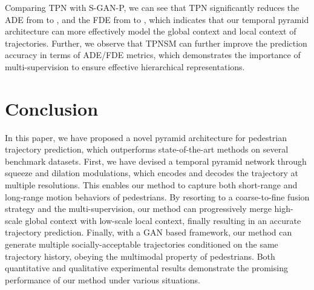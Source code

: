 \documentclass[letterpaper]{article} \usepackage{aaai21}  \usepackage{times}  \usepackage{helvet} \usepackage{courier}  \usepackage[hyphens]{url}  \usepackage{graphicx} \urlstyle{rm} \def\UrlFont{\rm}  \usepackage{natbib}  \usepackage{caption} \frenchspacing  \setlength{\pdfpagewidth}{8.5in}  \setlength{\pdfpageheight}{11in}
\begin{document}
Comparing TPN with S-GAN-P, we can see that TPN significantly reduces the ADE from  to , and the FDE from  to , which indicates that our temporal pyramid architecture can more effectively model the global context and local context of trajectories. 
Further, we observe that TPNSM can further improve the prediction accuracy in terms of ADE/FDE metrics, which demonstrates the importance of multi-supervision to ensure effective hierarchical representations. 






\section{Conclusion}  \label{sec:conclusion}
In this paper, we have proposed a novel pyramid architecture for pedestrian trajectory prediction, which outperforms state-of-the-art methods on several benchmark datasets. First, we have devised a temporal pyramid network through squeeze and dilation modulations, which encodes and decodes the trajectory at multiple resolutions. This enables our method to capture both short-range and long-range motion behaviors of pedestrians. By resorting to a coarse-to-fine fusion strategy and the multi-supervision, our method can progressively merge high-scale global context with low-scale local context, finally resulting in an accurate trajectory prediction.
Finally, with a GAN based framework, our method can generate multiple socially-acceptable trajectories conditioned on the same trajectory history, obeying the multimodal property of pedestrians. Both quantitative and qualitative experimental results demonstrate the promising performance of our method under various situations.








\end{document}
